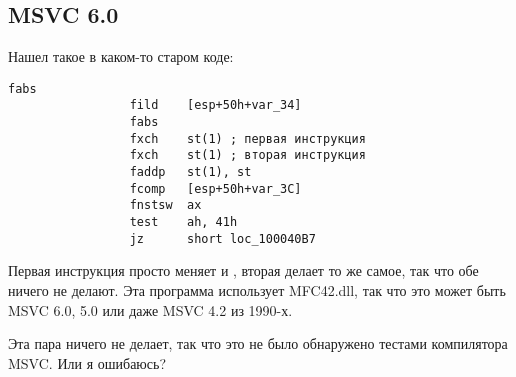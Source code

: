 \subsection{MSVC 6.0}

Нашел такое в каком-то старом коде:

\begin{lstlisting}[style=customasmx86]
                 fabs
                 fild    [esp+50h+var_34]
                 fabs
                 fxch    st(1) ; первая инструкция
                 fxch    st(1) ; вторая инструкция
                 faddp   st(1), st
                 fcomp   [esp+50h+var_3C]
                 fnstsw  ax
                 test    ah, 41h
                 jz      short loc_100040B7
\end{lstlisting}

Первая инструкция  просто меняет  и , вторая делает то же самое, так что обе ничего не делают.
Эта программа использует MFC42.dll, так что это может быть MSVC 6.0, 5.0 или даже MSVC 4.2 из 1990-х.

Эта пара ничего не делает, так что это не было обнаружено тестами компилятора MSVC.
Или я ошибаюсь?

